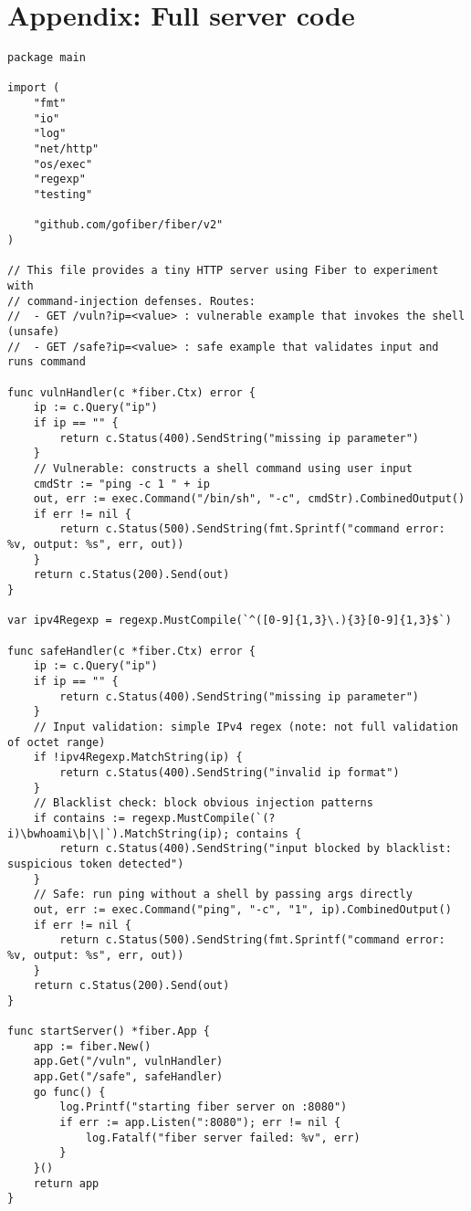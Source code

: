 \documentclass{article}
\begin{document}
\section{Appendix: Full server code}
\begin{lstlisting}[caption={Example server implementation using Go and the Fiber framework}, label={lst:go-server}, showspaces=false,showstringspaces=false]
package main

import (
	"fmt"
	"io"
	"log"
	"net/http"
	"os/exec"
	"regexp"
	"testing"

	"github.com/gofiber/fiber/v2"
)

// This file provides a tiny HTTP server using Fiber to experiment with
// command-injection defenses. Routes:
//  - GET /vuln?ip=<value> : vulnerable example that invokes the shell (unsafe)
//  - GET /safe?ip=<value> : safe example that validates input and runs command

func vulnHandler(c *fiber.Ctx) error {
	ip := c.Query("ip")
	if ip == "" {
		return c.Status(400).SendString("missing ip parameter")
	}
	// Vulnerable: constructs a shell command using user input
	cmdStr := "ping -c 1 " + ip
	out, err := exec.Command("/bin/sh", "-c", cmdStr).CombinedOutput()
	if err != nil {
		return c.Status(500).SendString(fmt.Sprintf("command error: %v, output: %s", err, out))
	}
	return c.Status(200).Send(out)
}

var ipv4Regexp = regexp.MustCompile(`^([0-9]{1,3}\.){3}[0-9]{1,3}$`)

func safeHandler(c *fiber.Ctx) error {
	ip := c.Query("ip")
	if ip == "" {
		return c.Status(400).SendString("missing ip parameter")
	}
	// Input validation: simple IPv4 regex (note: not full validation of octet range)
	if !ipv4Regexp.MatchString(ip) {
		return c.Status(400).SendString("invalid ip format")
	}
	// Blacklist check: block obvious injection patterns
	if contains := regexp.MustCompile(`(?i)\bwhoami\b|\|`).MatchString(ip); contains {
		return c.Status(400).SendString("input blocked by blacklist: suspicious token detected")
	}
	// Safe: run ping without a shell by passing args directly
	out, err := exec.Command("ping", "-c", "1", ip).CombinedOutput()
	if err != nil {
		return c.Status(500).SendString(fmt.Sprintf("command error: %v, output: %s", err, out))
	}
	return c.Status(200).Send(out)
}

func startServer() *fiber.App {
	app := fiber.New()
	app.Get("/vuln", vulnHandler)
	app.Get("/safe", safeHandler)
	go func() {
		log.Printf("starting fiber server on :8080")
		if err := app.Listen(":8080"); err != nil {
			log.Fatalf("fiber server failed: %v", err)
		}
	}()
	return app
}


\end{lstlisting}
\end{document}
